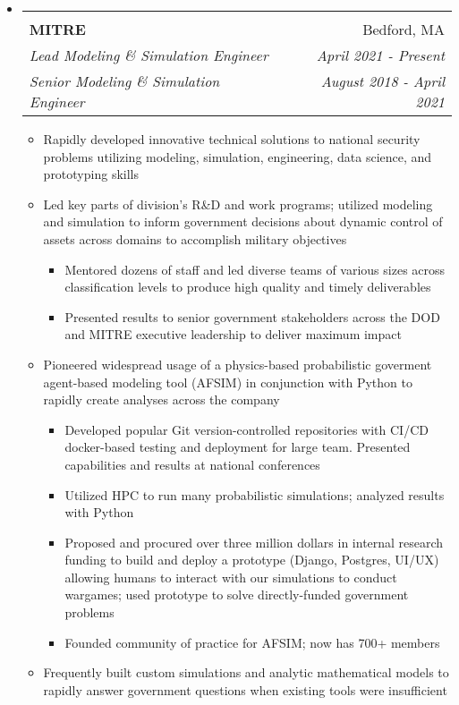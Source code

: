 \documentclass[letterpaper,11pt]{article}
\makeatletter
\newcommand{\ressubheadingmitre}[6]{\vspace{-29pt}
\begin{tabular*}{7.0in}{l@{\extracolsep{\fill}}r}
				\vspace{15pt} %
                \\
                \textbf{#1} & #2 \\
                \textit{#3} & \textit{#4} \\
                \textit{#5} & \textit{#6}
\end{tabular*}\vspace{-6pt}}
\makeatother
\begin{document}
\begin{itemize}
\item \ressubheadingmitre{MITRE}{Bedford, MA}{Lead Modeling \& Simulation Engineer}{April 2021 - Present}{Senior Modeling \& Simulation Engineer}{August 2018 - April 2021}

\begin{itemize}
\item Rapidly developed innovative technical solutions to national security problems utilizing modeling, simulation, engineering, data science, and prototyping skills

\item Led key parts of division's R\&D and work programs; utilized modeling and simulation to inform government decisions about dynamic control of assets across domains to accomplish military objectives
\begin{itemize}
\item Mentored dozens of staff and led diverse teams of various sizes across classification levels to produce high quality and timely deliverables
\item Presented results to senior government stakeholders across the DOD and MITRE executive leadership to deliver maximum impact
\end{itemize}


\item Pioneered widespread usage of a physics-based probabilistic goverment agent-based modeling tool (AFSIM) in conjunction with Python to rapidly create analyses across the company 
\begin{itemize}
\item Developed popular Git version-controlled repositories with CI/CD docker-based testing and deployment for large team. Presented capabilities and results at national conferences
\item Utilized HPC to run many probabilistic simulations; analyzed results with Python 
\item  Proposed and procured over three million dollars in internal research funding to build and deploy a prototype (Django, Postgres, UI/UX) allowing humans to interact with our simulations to conduct wargames; used prototype to solve directly-funded government problems
\item Founded community of practice for AFSIM; now has 700+ members
\end{itemize}
\item{Frequently built custom simulations and analytic mathematical models to rapidly answer government questions when existing tools were insufficient}
\end{itemize}
\end{itemize}
\end{document}
